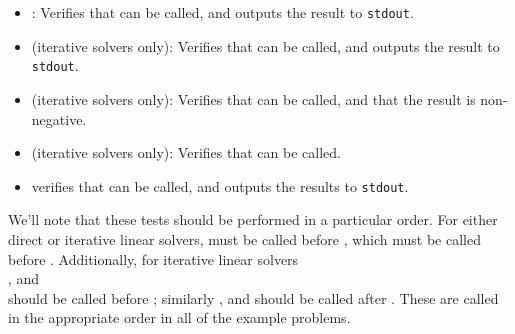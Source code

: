 \begin{itemize}
\item {}: Verifies that  can
  be called, and outputs the result to \texttt{stdout}.
\item {} (iterative solvers only): Verifies that
   can be called, and outputs the result to
  \texttt{stdout}.
\item {} (iterative solvers only): Verifies that
   can be called, and that the result is
  non-negative.
\item {} (iterative solvers only): Verifies that
   can be called.
\item {} verifies that  can be
  called, and outputs the results to \texttt{stdout}.
\end{itemize}
We'll note that these tests should be performed in a particular
order.  For either direct or iterative linear
solvers,  must be called
before , which must be called
before .  Additionally, for iterative linear
solvers \\ \noindent
{}, 
and \\ \noindent
{} should be called
before ;
similarly , 
and  should be called
after .  These are called in the appropriate
order in all of the example problems.
